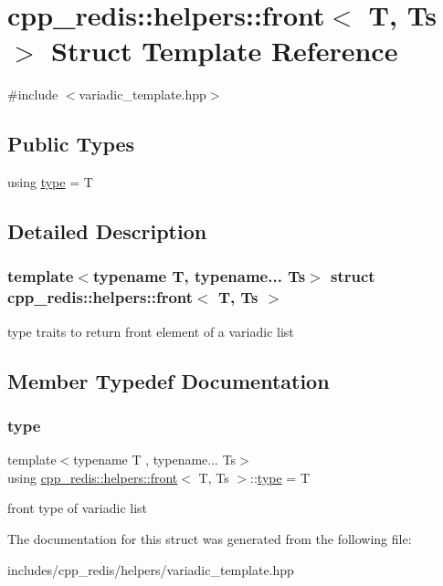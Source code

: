 \hypertarget{structcpp__redis_1_1helpers_1_1front}{}\section{cpp\+\_\+redis\+:\+:helpers\+:\+:front$<$ T, Ts $>$ Struct Template Reference}
\label{structcpp__redis_1_1helpers_1_1front}


{\ttfamily \#include $<$variadic\+\_\+template.\+hpp$>$}

\subsection*{Public Types}
\begin{DoxyCompactItemize}
\item 
using \mbox{\hyperlink{structcpp__redis_1_1helpers_1_1front_a23178392c9417cc5ada75205931d1768}{type}} = T
\end{DoxyCompactItemize}


\subsection{Detailed Description}
\subsubsection*{template$<$typename T, typename... Ts$>$\newline
struct cpp\+\_\+redis\+::helpers\+::front$<$ T, Ts $>$}

type traits to return front element of a variadic list 

\subsection{Member Typedef Documentation}
\mbox{\label{structcpp__redis_1_1helpers_1_1front_a23178392c9417cc5ada75205931d1768}} 
\subsubsection{\texorpdfstring{type}{type}}
{\footnotesize\ttfamily template$<$typename T , typename... Ts$>$ \\
using \mbox{\hyperlink{structcpp__redis_1_1helpers_1_1front}{cpp\+\_\+redis\+::helpers\+::front}}$<$ T, Ts $>$\+::\mbox{\hyperlink{structcpp__redis_1_1helpers_1_1front_a23178392c9417cc5ada75205931d1768}{type}} =  T}

front type of variadic list 

The documentation for this struct was generated from the following file\+:\begin{DoxyCompactItemize}
\item 
includes/cpp\+\_\+redis/helpers/variadic\+\_\+template.\+hpp\end{DoxyCompactItemize}
